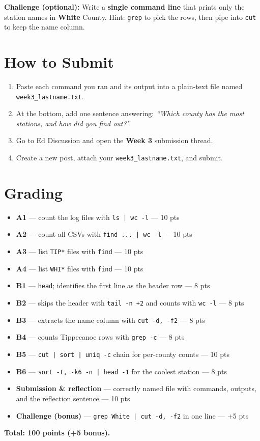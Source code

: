 \documentclass[11pt]{article}
\begin{document}
\textbf{Challenge (optional):} Write a \textbf{single command line} that prints only the station names in \textbf{White} County. Hint: \texttt{grep} to pick the rows, then pipe into \texttt{cut} to keep the name column.

\section{How to Submit}
\begin{enumerate}
    \item Paste each command you ran and its output into a plain-text file named \texttt{week3\_lastname.txt}.
    \item At the bottom, add one sentence answering: \textit{``Which county has the most stations, and how did you find out?''}
    \item Go to Ed Discussion and open the \textbf{Week 3} submission thread.
    \item Create a new post, attach your \texttt{week3\_lastname.txt}, and submit.
\end{enumerate}

\section{Grading}
\begin{itemize}
    \item \textbf{A1} --- count the log files with \texttt{ls | wc -l} --- 10 pts
    \item \textbf{A2} --- count all CSVs with \texttt{find ... | wc -l} --- 10 pts
    \item \textbf{A3} --- list \texttt{TIP*} files with \texttt{find} --- 10 pts
    \item \textbf{A4} --- list \texttt{WHI*} files with \texttt{find} --- 10 pts
    \item \textbf{B1} --- \texttt{head}; identifies the first line as the header row --- 8 pts
    \item \textbf{B2} --- skips the header with \texttt{tail -n +2} and counts with \texttt{wc -l} --- 8 pts
    \item \textbf{B3} --- extracts the name column with \texttt{cut -d, -f2} --- 8 pts
    \item \textbf{B4} --- counts Tippecanoe rows with \texttt{grep -c} --- 8 pts
    \item \textbf{B5} --- \texttt{cut | sort | uniq -c} chain for per-county counts --- 10 pts
    \item \textbf{B6} --- \texttt{sort -t, -k6 -n | head -1} for the coolest station --- 8 pts
    \item \textbf{Submission \& reflection} --- correctly named file with commands, outputs, and the reflection sentence --- 10 pts
    \item \textbf{Challenge (bonus)} --- \texttt{grep White | cut -d, -f2} in one line --- +5 pts
\end{itemize}
\textbf{Total: 100 points (+5 bonus).}
\end{document}
